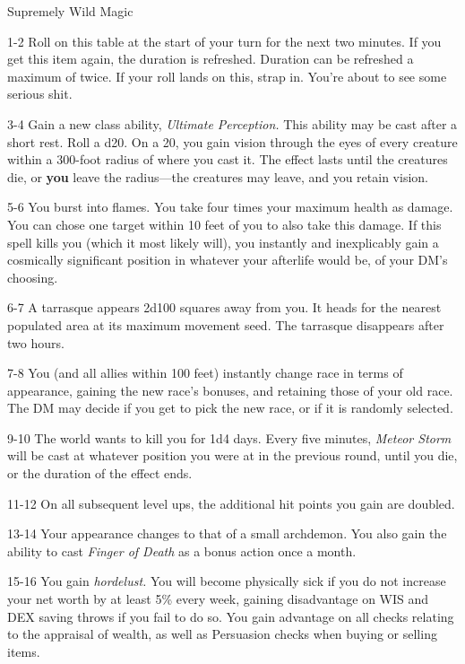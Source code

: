 \begin{rolltable}{Supremely Wild Magic}
\item[1-2] Roll on this table at the start of your turn for the next two minutes.
If you get this item again, the duration is refreshed.
Duration can be refreshed a maximum of twice.
If your roll lands on this, strap in.
You're about to see some serious shit.
\item[3-4] Gain a new class ability, \textit{Ultimate Perception.}
This ability may be cast after a short rest.
Roll a d20.
On a 20, you gain vision through the eyes of every creature within a 300-foot radius of where you cast it.
The effect lasts until the creatures die, or \textbf{you} leave the radius---the creatures may leave, and you retain vision.
\item[5-6] You burst into flames. You take four times your maximum health as damage.
You can chose one target within 10 feet of you to also take this damage.
If this spell kills you (which it most likely will), you instantly and inexplicably gain a cosmically significant position in whatever your afterlife would be, of your DM's choosing.
\item[6-7] A tarrasque appears 2d100 squares away from you. 
It heads for the nearest populated area at its maximum movement seed. 
The tarrasque disappears after two hours.
\item[7-8] You (and all allies within 100 feet) instantly change race in terms of appearance, gaining the new race's bonuses, and retaining those of your old race.
The DM may decide if you get to pick the new race, or if it is randomly selected.
\item[9-10] The world wants to kill you for 1d4 days.
Every five minutes, \textit{Meteor Storm} will be cast at whatever position you were at in the previous round, until you die, or the duration of the effect ends.
\item[11-12] On all subsequent level ups, the additional hit points you gain are doubled.
\item[13-14] Your appearance changes to that of a small archdemon.
You also gain the ability to cast \textit{Finger of Death} as a bonus action once a month.
\item[15-16] You gain \textit{hordelust.}
You will become physically sick if you do not increase your net worth by at least 5\% every week, gaining disadvantage on WIS and DEX saving throws if you fail to do so.
You gain advantage on all checks relating to the appraisal of wealth, as well as Persuasion checks when buying or selling items.

\end{rolltable}
